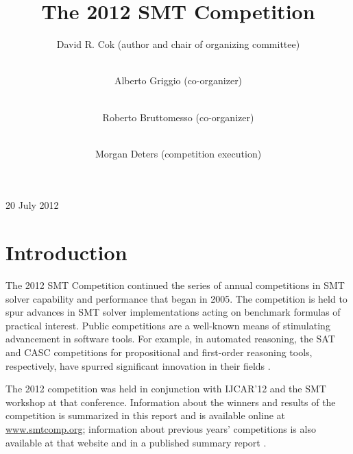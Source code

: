 \documentclass{llncs}
\begin{document}
\title{The 2012 SMT Competition}

\author{David R. Cok (author and chair of organizing committee) \and \\ 
Alberto Griggio (co-organizer) \and \\ 
Roberto Bruttomesso (co-organizer) \and \\
Morgan Deters (competition execution)  \\
}


\maketitle
\pagestyle{plain}
\centerline{20 July 2012}


\section{Introduction}
The 2012 SMT Competition continued the series of annual competitions in SMT solver capability and performance that began in 2005.
The competition is held to spur advances in
SMT solver implementations acting on benchmark formulas of practical interest. Public competitions are
a well-known means of stimulating advancement in software tools. For example, in automated
reasoning, the SAT and CASC competitions for propositional and first-order reasoning tools, respectively,
have spurred significant innovation in their fields \cite{leberre+03,PSS02}.

The 2012 competition was held in conjunction with IJCAR'12 and the SMT workshop at that conference. Information about the winners
and results of the competition is summarized in this report and is available online at \url{www.smtcomp.org}; information
about previous years' competitions is also available at that website and in a published summary report \cite{springerlink:10.1007/s10817-012-9246-5}.
\end{document}
